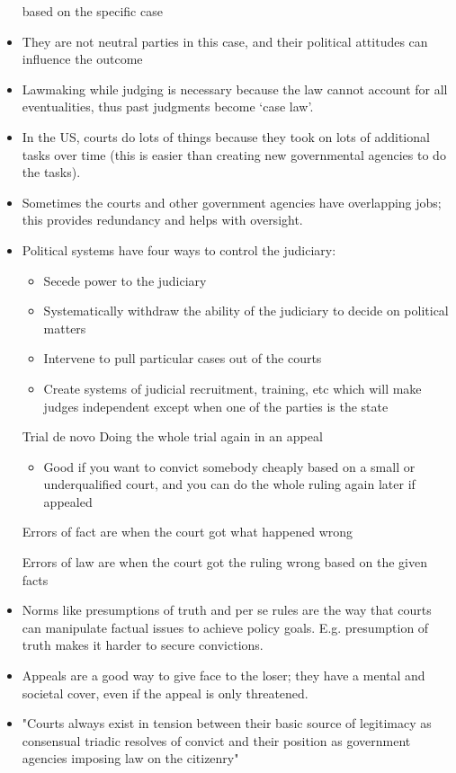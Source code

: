 \documentclass[11pt]{article}
\begin{document}
\begin{itemize}
based on the specific case
\item They are not neutral parties in this case, and their political attitudes can
influence the outcome
\item Lawmaking while judging is necessary because the law cannot account for all
eventualities, thus past judgments become `case law'.
\item In the US, courts do lots of things because they took on lots of additional
tasks over time (this is easier than creating new governmental agencies to do
the tasks).
\item Sometimes the courts and other government agencies have overlapping jobs; this
provides redundancy and helps with oversight.
\item Political systems have four ways to control the judiciary:
\begin{itemize}
\item Secede power to the judiciary
\item Systematically withdraw the ability of the judiciary to decide on political matters
\item Intervene to pull particular cases out of the courts
\item Create systems of judicial recruitment, training, etc which will make judges
independent except when one of the parties is the state
\end{itemize}
\item[{Trial de novo}] Doing the whole trial again in an appeal
\begin{itemize}
\item Good if you want to convict somebody cheaply based on a small or
underqualified court, and you can do the whole ruling again later if
appealed
\end{itemize}
\item[{Errors of fact}] are when the court got what happened wrong
\item[{Errors of law}] are when the court got the ruling wrong based on the given facts
\item Norms like presumptions of truth and per se rules are the way that courts can
manipulate factual issues to achieve policy goals. E.g. presumption of truth
makes it harder to secure convictions.
\item Appeals are a good way to give face to the loser; they have a mental and
societal cover, even if the appeal is only threatened.
\item "Courts always exist in tension between their basic source of legitimacy as
consensual triadic resolves of convict and their position as government
agencies imposing law on the citizenry"
\end{itemize}
\end{document}
